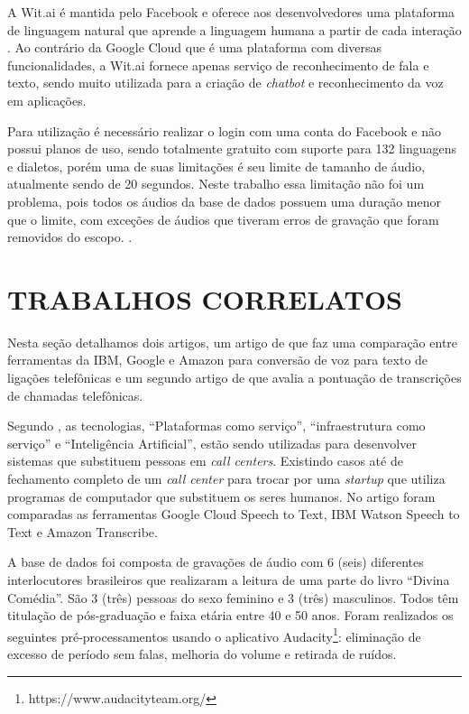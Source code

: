 A Wit.ai é mantida pelo Facebook e oferece aos desenvolvedores uma plataforma de linguagem natural que aprende a linguagem humana a partir de cada interação \cite{mitrevski2018getting}. Ao contrário da Google Cloud que é uma plataforma com diversas funcionalidades, a Wit.ai fornece apenas serviço de reconhecimento de fala e texto, sendo muito utilizada para a criação de \textit{chatbot} e reconhecimento da voz em aplicações. 

Para utilização é necessário realizar o login com uma conta do Facebook e não possui planos de uso, sendo totalmente gratuito com suporte para 132 linguagens e dialetos, porém uma de suas limitações é seu limite de tamanho de áudio, atualmente sendo de 20 segundos. Neste trabalho essa limitação não foi um problema, pois todos os áudios da base de dados possuem uma duração menor que o limite, com exceções de áudios que tiveram erros de gravação que foram removidos do escopo. \cite{WIT}.

\section{TRABALHOS CORRELATOS}

Nesta seção detalhamos dois artigos, um artigo de  que faz uma comparação entre ferramentas da IBM, Google e Amazon para conversão de voz para texto de ligações telefônicas e um segundo artigo de   que avalia a pontuação de transcrições de chamadas telefônicas.


Segundo , as tecnologias, ``Plataformas como serviço'', ``infraestrutura como serviço'' e ``Inteligência Artificial'',  estão sendo utilizadas para desenvolver sistemas que substituem pessoas em \textit{call centers}. Existindo casos até de fechamento completo de um \textit{call center} para trocar por uma \textit{startup} que utiliza programas de computador que substituem os seres humanos.
No artigo \cite{iinumaspeech} foram comparadas as ferramentas Google Cloud Speech to Text, IBM Watson Speech to Text e Amazon Transcribe. 

A base de dados foi composta de gravações de áudio com 6 (seis) diferentes interlocutores brasileiros que realizaram a leitura de uma parte do livro ``Divina Comédia''. São 3 (três) pessoas do sexo feminino e 3 (três) masculinos. Todos têm titulação de pós-graduação e faixa etária entre 40 e 50 anos. Foram realizados os seguintes pré-processamentos usando o aplicativo Audacity\footnote{https://www.audacityteam.org/}: eliminação de excesso de período sem falas, melhoria do volume e retirada de ruídos. 

